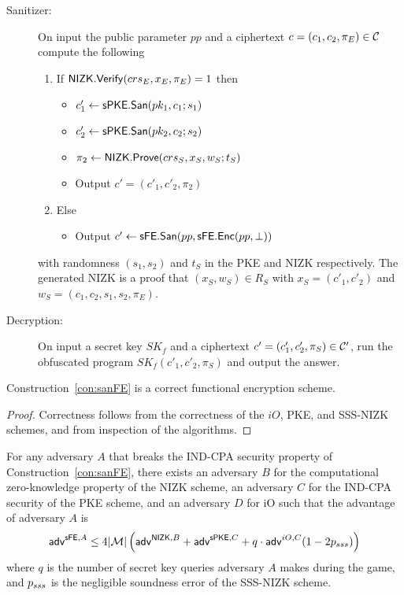 \documentclass{llncs}
\begin{document}
\begin{description}
\item[Sanitizer:] On input the public parameter $pp$ and a ciphertext $c = (c_1,c_2,\pi_E) \in \mathcal{C}$ compute the following
	\begin{enumerate}
	\item If $\mathsf{NIZK}.\mathsf{Verify}(crs_E,x_E,\pi_E) = 1$ then
		\begin{itemize}
		\item[] $c'_1 \gets \mathsf{sPKE}.\mathsf{San}(pk_1,c_1;s_1)$
		\item[] $c'_2 \gets \mathsf{sPKE}.\mathsf{San}(pk_2,c_2;s_2)$
		\item[] $\pi_2 \gets \mathsf{NIZK}.\mathsf{Prove}(crs_S,x_S,w_S;t_S)$
		\item[] Output $c' = (c'_1,c'_2,\pi_2)$
		\end{itemize}
	\item Else
		\begin{itemize}
		\item[] Output $c' \leftarrow \mathsf{sFE}.\mathsf{San}(pp,\mathsf{sFE}.\mathsf{Enc}(pp,\bot))$
		\end{itemize}
	\end{enumerate}
	with randomness $(s_1,s_2)$ and $t_S$ in the PKE and NIZK respectively. The  generated NIZK is a proof that $(x_S,w_S) \in R_S$ with $x_S = (c'_1,c'_2)$  and $w_S = (c_1,c_2,s_1,s_2,\pi_E)$.
	
	
\item[Decryption:] On input a secret key $SK_f$ and a ciphertext $c' = (c'_1,c'_2,\pi_S) \in \mathcal{C}'$, run the obfuscated program $SK_f(c'_1,c'_2,\pi_S)$ and output the answer.


\end{description}


\begin{lem}
Construction~\ref{con:sanFE} is a correct functional encryption scheme.
\end{lem}

\begin{proof}
Correctness follows from the correctness of the $iO$, PKE, and SSS-NIZK schemes, and from inspection of the algorithms.
\end{proof}



\begin{lem}\label{lem:IND-CPA_sFE}
For any adversary $A$ that breaks the IND-CPA security property of Construction~\ref{con:sanFE}, there exists an adversary $B$ for the computational zero-knowledge property of the NIZK scheme, an adversary $C$ for the IND-CPA security of the PKE scheme, and an adversary $D$ for iO such that the advantage of adversary $A$ is
\begin{align*}
	\mathsf{adv}^{\mathsf{sFE},A} \leq 4|\mathcal{M}| \left( \mathsf{adv}^{\mathsf{NIZK},B} + \mathsf{adv}^{\mathsf{sPKE},C} + q\cdot\mathsf{adv}^{iO,C} (1 - 2p_{sss}) \right)
\end{align*}
where $q$ is the number of secret key queries adversary $A$ makes during the game, and $p_{sss}$ is the negligible soundness error of the SSS-NIZK scheme.
\end{lem}
\end{document}
